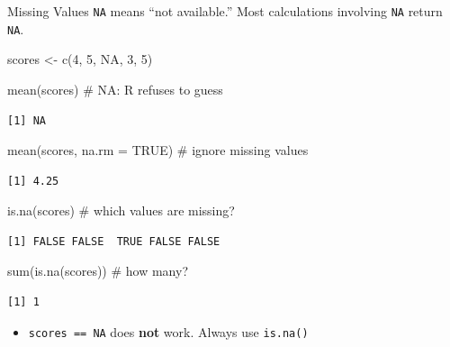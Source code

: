 \documentclass[
  ignorenonframetext,
  aspectratio=169,
]{beamer}
\newenvironment{Shaded}{\begin{snugshade}}{\end{snugshade}}
\newcommand{\AttributeTok}[1]{\textcolor[rgb]{0.40,0.45,0.13}{#1}}
\newcommand{\CommentTok}[1]{\textcolor[rgb]{0.37,0.37,0.37}{#1}}
\newcommand{\ConstantTok}[1]{\textcolor[rgb]{0.56,0.35,0.01}{#1}}
\newcommand{\DecValTok}[1]{\textcolor[rgb]{0.68,0.00,0.00}{#1}}
\newcommand{\FunctionTok}[1]{\textcolor[rgb]{0.28,0.35,0.67}{#1}}
\newcommand{\NormalTok}[1]{\textcolor[rgb]{0.00,0.23,0.31}{#1}}
\newcommand{\OtherTok}[1]{\textcolor[rgb]{0.00,0.23,0.31}{#1}}
\providecommand{\tightlist}{%
  \setlength{\itemsep}{0pt}\setlength{\parskip}{0pt}}\usepackage{longtable,booktabs,array}
\begin{document}
\begin{frame}[fragile]{Missing Values}
\protect\hypertarget{sec-na}{}
\texttt{NA} means ``not available.'' Most calculations involving
\texttt{NA} return \texttt{NA}.

\begin{Shaded}
\begin{Highlighting}[]
\NormalTok{scores }\OtherTok{\textless{}{-}} \FunctionTok{c}\NormalTok{(}\DecValTok{4}\NormalTok{, }\DecValTok{5}\NormalTok{, }\ConstantTok{NA}\NormalTok{, }\DecValTok{3}\NormalTok{, }\DecValTok{5}\NormalTok{)}

\FunctionTok{mean}\NormalTok{(scores)                 }\CommentTok{\# NA: R refuses to guess}
\end{Highlighting}
\end{Shaded}

\begin{verbatim}
[1] NA
\end{verbatim}

\begin{Shaded}
\begin{Highlighting}[]
\FunctionTok{mean}\NormalTok{(scores, }\AttributeTok{na.rm =} \ConstantTok{TRUE}\NormalTok{)   }\CommentTok{\# ignore missing values}
\end{Highlighting}
\end{Shaded}

\begin{verbatim}
[1] 4.25
\end{verbatim}

\begin{Shaded}
\begin{Highlighting}[]
\FunctionTok{is.na}\NormalTok{(scores)                }\CommentTok{\# which values are missing?}
\end{Highlighting}
\end{Shaded}

\begin{verbatim}
[1] FALSE FALSE  TRUE FALSE FALSE
\end{verbatim}

\begin{Shaded}
\begin{Highlighting}[]
\FunctionTok{sum}\NormalTok{(}\FunctionTok{is.na}\NormalTok{(scores))           }\CommentTok{\# how many?}
\end{Highlighting}
\end{Shaded}

\begin{verbatim}
[1] 1
\end{verbatim}

\begin{itemize}
\tightlist
\item
  \texttt{scores\ ==\ NA} does \textbf{not} work. Always use
  \texttt{is.na()}
\end{itemize}
\end{frame}
\end{document}
